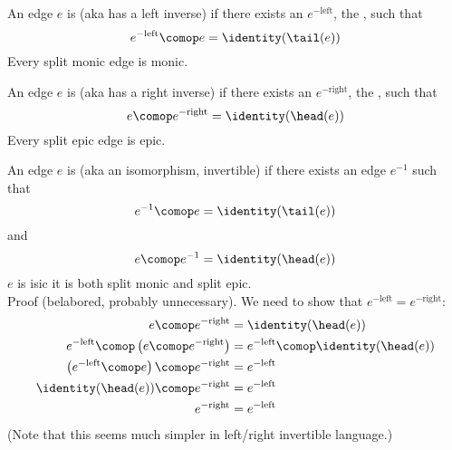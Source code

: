 \documentclass[11pt,openany]{book}
\let\oldfigure\figure%
\let\endoldfigure\endfigure%
\renewenvironment{figure}[1][htbp]%
  {\oldfigure[#1]\mdframed[backgroundcolor=GhostWhite,linecolor=GhostWhite]}
  {\endmdframed\endoldfigure}
\begin{document}
An edge $e$ is  (aka has a left inverse)
if there exists an $e^{-\text{left}}$, the ,
such that
\[
e^{-\text{left}} \comop e = \identity(\tail(e))
\]
Every split monic edge is monic.

\begin{figure}
\centering
{}
\caption{Split epic edge $e$, if the two edge path
$V_1 \longrightarrow V_1$
composes to the identity loop.}
\label{fig:split_epic}
\end{figure}

An edge $e$ is  (aka has a right inverse)
if there exists an $e^{-\text{right}}$, the , 
such that
\[
e \comop e^{-\text{right}} = \identity(\head(e))
\]
Every split epic edge is epic.

\begin{figure}
\centering
{}
\caption{Isic edge $e$, if both paths $V_0 \longrightarrow V_0$
are equivalent (compose to the identity loop) and the 
same for both paths $V_1 \longrightarrow V_1$.}
\label{fig:isic}
\end{figure}

An edge $e$ is  (aka an isomorphism, invertible)
if there exists an edge $e^{-1}$ such that
\[
e^{-1} \comop e = \identity(\tail(e))
\]
and
\[
e \comop e^{-1} = \identity(\head(e))
\]
$e$ is isic \liff it is both split monic and split epic.\\
Proof (belabored, probably unnecessary).
We need to show that $e^{-\text{left}} = e^{-\text{right}}$:
\begin{align*}
e \comop e^{-\text{right}} 
& = 
\identity(\head(e)) 
\\
e^{-\text{left}} \comop \left( e \comop e^{-\text{right}} \right)
& = 
e^{-\text{left}} \comop \identity(\head(e)) 
\\
\left( e^{-\text{left}} \comop e \right) \comop e^{-\text{right}} 
& = 
e^{-\text{left}}
\\
\identity(\head(e)) \comop e^{-\text{right}} 
& = 
e^{-\text{left}} 
\\
e^{-\text{right}} 
& = 
e^{-\text{left}} 
\end{align*}
(Note that this seems much simpler in left/right invertible language.)
\end{document}
